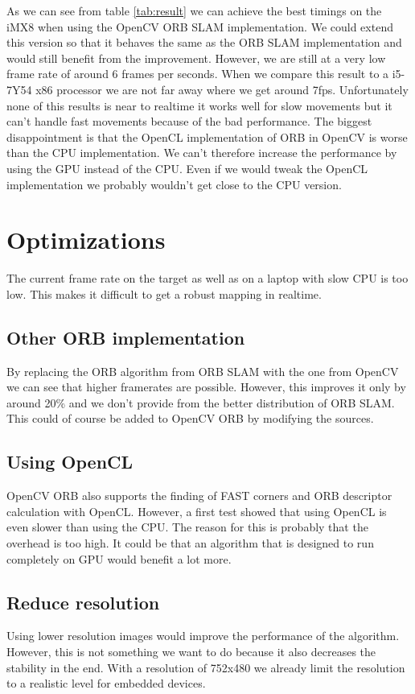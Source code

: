 \documentclass[11pt,a4paper,titlepage,oneside]{report}
\begin{document}
As we can see from table \ref{tab:result} we can achieve the best timings on the iMX8 when using the OpenCV ORB SLAM implementation. We could extend this version so that it behaves the same as the ORB SLAM implementation and would still benefit from the improvement. However, we are still at a very low frame rate of around 6 frames per seconds. When we compare this result to a i5-7Y54 x86 processor we are not far away where we get around 7fps. Unfortunately none of this results is near to realtime it works well for slow movements but it can't handle fast movements because of the bad performance. The biggest disappointment is that the OpenCL implementation of ORB in OpenCV is worse than the CPU implementation. We can't therefore increase the performance by using the GPU instead of the CPU. Even if we would tweak the OpenCL implementation we probably wouldn't get close to the CPU version.

\section{Optimizations}

The current frame rate on the target as well as on a laptop with slow CPU is too low. This makes it difficult to get a robust mapping in realtime.

\subsection{Other ORB implementation}
By replacing the ORB algorithm from ORB SLAM with the one from OpenCV we can see that higher framerates are possible. However, this improves it only by around 20\% and we don't provide from the better distribution of ORB SLAM. This could of course be added to OpenCV ORB by modifying the sources.

\subsection{Using OpenCL}
OpenCV ORB also supports the finding of FAST corners and ORB descriptor calculation with OpenCL. However, a first test showed that using OpenCL is even slower than using the CPU. The reason for this is probably that the overhead is too high. It could be that an algorithm that is designed to run completely on GPU would benefit a lot more.

\subsection{Reduce resolution}
Using lower resolution images would improve the performance of the algorithm. However, this is not something we want to do because it also decreases the stability in the end. With a resolution of 752x480 we already limit the resolution to a realistic level for embedded devices.
\end{document}
